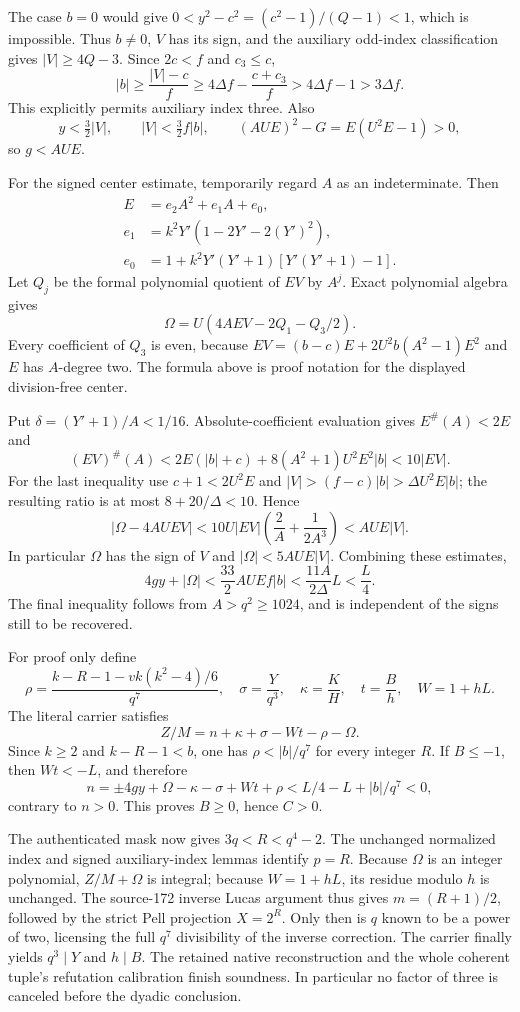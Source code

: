 The case $b=0$ would give
$0<y^2-c^2=(c^2-1)/(Q-1)<1$, which is impossible.  Thus $b\ne0$,
$V$ has its sign, and the auxiliary odd-index classification gives
$|V|\ge4Q-3$.  Since $2c<f$ and $c_3\le c$,
\[
 |b|\ge\frac{|V|-c}{f}
 \ge4\Delta f-\frac{c+c_3}{f}
 >4\Delta f-1>3\Delta f.
\]
This explicitly permits auxiliary index three.  Also
\[
 y<\tfrac32|V|,\qquad |V|<\tfrac32f|b|,
 \qquad (AUE)^2-G=E(U^2E-1)>0,
\]
so $g<AUE$.

For the signed center estimate, temporarily regard $A$ as an indeterminate.
Then
\begin{align*}
 E&=e_2A^2+e_1A+e_0,\\
 e_1&=k^2Y'(1-2Y'-2(Y')^2),\\
 e_0&=1+k^2Y'(Y'+1)[Y'(Y'+1)-1].
\end{align*}
Let $Q_j$ be the formal polynomial quotient of $EV$ by $A^j$.  Exact
polynomial algebra gives
\[
 \Omega=U(4AEV-2Q_1-Q_3/2).
\]
Every coefficient of $Q_3$ is even, because
$EV=(b-c)E+2U^2b(A^2-1)E^2$ and $E$ has $A$-degree two.
The formula above is proof notation for the displayed division-free center.

Put $\delta=(Y'+1)/A<1/16$.  Absolute-coefficient evaluation gives
$E^\#(A)<2E$ and
\[
 (EV)^\#(A)
 <2E(|b|+c)+8(A^2+1)U^2E^2|b|<10|EV|.
\]
For the last inequality use $c+1<2U^2E$ and
$|V|>(f-c)|b|>\Delta U^2E|b|$; the resulting ratio is at most
$8+20/\Delta<10$.  Hence
\[
 |\Omega-4AUEV|
 <10U|EV|\left(\frac2A+\frac1{2A^3}\right)<AUE|V|.
\]
In particular $\Omega$ has the sign of $V$ and
$|\Omega|<5AUE|V|$.  Combining these estimates,
\[
 4gy+|\Omega|
 <\frac{33}{2}AUEf|b|
 <\frac{11A}{2\Delta}L<\frac L4.
\]
The final inequality follows from $A>q^2\ge1024$, and is independent
of the signs still to be recovered.

For proof only define
\[
 \rho=\frac{k-R-1-vk(k^2-4)/6}{q^7},\quad
 \sigma=\frac{Y}{q^3},\quad\kappa=\frac KH,
 \quad t=\frac Bh,\quad W=1+hL.
\]
The literal carrier satisfies
\[
 Z/M=n+\kappa+\sigma-Wt-\rho-\Omega.
\]
Since $k\ge2$ and $k-R-1<b$, one has $\rho<|b|/q^7$ for every
integer $R$.  If $B\le-1$, then $Wt<-L$, and therefore
\[
 n=\pm4gy+\Omega-\kappa-\sigma+Wt+\rho
 <L/4-L+|b|/q^7<0,
\]
contrary to $n>0$.  This proves $B\ge0$, hence $C>0$.

The authenticated mask now gives $3q<R<q^4-2$.  The unchanged normalized
index and signed auxiliary-index lemmas identify $p=R$.  Because $\Omega$
is an integer polynomial, $Z/M+\Omega$ is integral; because $W=1+hL$,
its residue modulo $h$ is unchanged.  The source-172 inverse Lucas argument
thus gives $m=(R+1)/2$, followed by the strict Pell projection $X=2^R$.
Only then is $q$ known to be a power of two, licensing the full
$q^7$ divisibility of the inverse correction.  The carrier finally yields
$q^3\mid Y$ and $h\mid B$.  The retained native reconstruction and the
whole coherent tuple's refutation calibration finish soundness.  In
particular no factor of three is canceled before the dyadic conclusion.

